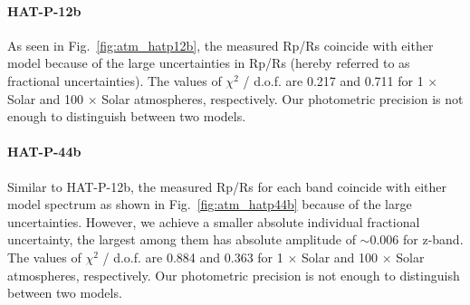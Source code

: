 \paragraph{HAT-P-12b}
As seen in Fig.~\ref{fig:atm_hatp12b}, the measured Rp/Rs coincide with either model because of the large uncertainties in Rp/Rs (hereby referred to as fractional uncertainties). %
The values of $\chi^2$ / d.o.f. are 0.217 and 0.711 for 1 $\times$ Solar and 100 $\times$ Solar atmospheres, respectively. Our photometric precision is not enough to distinguish between two models.

\paragraph{HAT-P-44b}
Similar to HAT-P-12b, the measured Rp/Rs for each band coincide with either model spectrum as shown in Fig.~\ref{fig:atm_hatp44b} because of the large uncertainties. However, we achieve a smaller absolute individual fractional uncertainty, the largest among them has absolute amplitude of $\sim$0.006 for z-band. %
The values of $\chi^2$ / d.o.f. are 0.884 and 0.363 %
for 1 $\times$ Solar and 100 $\times$ Solar atmospheres, respectively. Our photometric precision is not enough to distinguish between two models.

